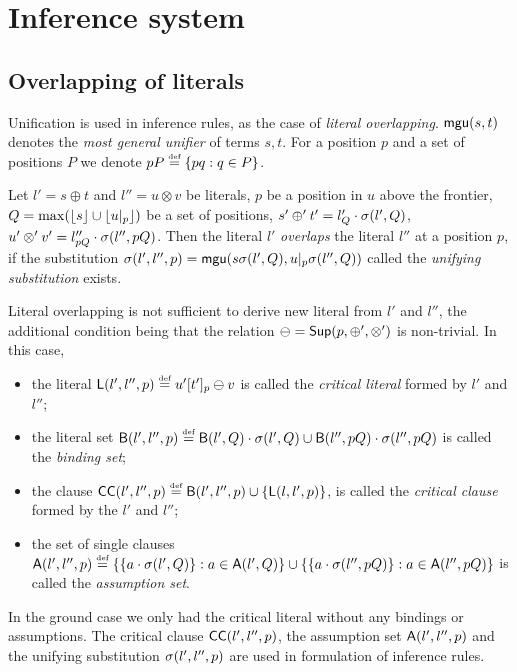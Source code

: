 \section{Inference system}\label{se:reasoning}

\subsection{Overlapping of literals}
%
Unification is used in inference rules, as the
case of {\em literal overlapping}.  \({\sf mgu}(s,t)\) denotes the {\em most
general unifier} of terms $s,t$.  For a position $p$ and a set of
positions $P$ we denote \(pP\mathrel {\stackrel {\mbox {\tiny def}}{=}} \{pq: q\in P\}\).

\begin{definition}\label {def:literal-overalap}
Let \(l'=s\oplus t\) and \(l''=u \otimes v\) be literals, $p$ be a position
in $u$ above the frontier, \(Q=\max(\lfloor s\rfloor \cup \lfloor u|_{p}\rfloor)\) be a set of positions, \( s'\oplus' t' = l'_Q \cdot \sigma(l',Q)\),
\(u'\otimes' v' = l''_{pQ} \cdot \sigma(l'',pQ)\).  Then the literal $l'$
{\em overlaps} the literal $l''$ at a position $p$, if the substitution
\(\sigma(l',l'',p) ={\sf mgu} (s\sigma(l',Q), u|_{p}\sigma(l'',Q))\)
called the {\em unifying substitution} exists.
\end{definition}

Literal overlapping is not sufficient to derive new literal from $l'$ and
$l''$, the additional condition being that the relation \(\ominus
=\mbox {\sf Sup}(p ,\oplus' ,\otimes')\) is non-trivial.  In this case,
\begin{itemize}\smallerspaces
\item the literal \({\sf L} (l',l'',p)\mathrel {\stackrel {\mbox {\tiny def}}{=}} u'[t']_p\ominus v\) is called the {\em
    critical literal} formed by  \(l'\) and \(l''\); 
\item the literal set \({\sf B}(l',l'',p)\mathrel {\stackrel {\mbox {\tiny def}}{=}} {\sf B}(l',Q) \cdot \sigma(l',Q )\cup
   {\sf B}(l'',pQ) \cdot \sigma(l'',pQ)\) is called the {\em binding set};
\item the clause \({\sf CC}(l',l'',p)\mathrel {\stackrel {\mbox {\tiny def}}{=}} {\sf B}(l',l'',p) \cup \{{\sf L} (l,l',p)\}\), 
   is called the {\em critical clause} formed by the  \(l'\) and \(l''\);
\item the set of single clauses \({\sf A}(l',l'',p)\mathrel {\stackrel {\mbox {\tiny def}}{=}} \{\{a \cdot \sigma(l',Q)\}:
   a\in{\sf A}(l',Q)\} \cup \{\{a \cdot \sigma(l'',pQ)\}: a\in{\sf A}(l'',pQ)\}\) is
   called the {\em assumption set}.
\end{itemize}
%
In the ground case \cite{KW} 
we only had the critical literal without any bindings or
assumptions.  The critical clause \({\sf CC}(l',l'',p)\), the assumption set
\({\sf A}(l',l'',p)\) and the unifying substitution \(\sigma(l',l'',p)\) are
used in formulation of inference rules.

